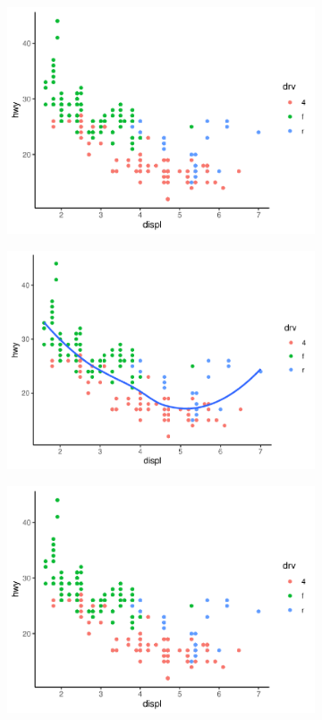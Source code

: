 \begin{figure}[!h]
	\begin{subfigure}{\linewidth}
		\includegraphics{fig/plot}
	\end{subfigure}
	\begin{subfigure}{\linewidth}
	\includegraphics{fig/plot2}
	\end{subfigure}
	\begin{subfigure}{\linewidth}
		\includegraphics{fig/plot}
	\end{subfigure}
\end{figure}

